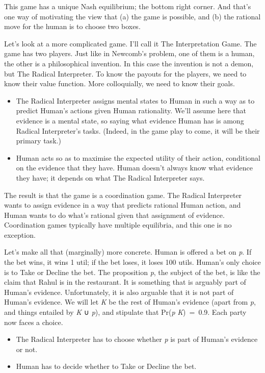 \documentclass[
  12pt,
  letterpaper,
]{scrbook}
\providecommand{\tightlist}{%
  \setlength{\itemsep}{0pt}\setlength{\parskip}{0pt}}\usepackage{longtable,booktabs,array}
\begin{document}
This game has a unique Nash equilibrium; the bottom right corner. And
that's one way of motivating the view that (a) the game is possible, and
(b) the rational move for the human is to choose two boxes.

Let's look at a more complicated game. I'll call it The Interpretation
Game. The game has two players. Just like in Newcomb's problem, one of
them is a human, the other is a philosophical invention. In this case
the invention is not a demon, but The Radical Interpreter. To know the
payouts for the players, we need to know their value function. More
colloquially, we need to know their goals.

\begin{itemize}
\tightlist
\item
  The Radical Interpreter assigns mental states to Human in such a way
  as to predict Human's actions given Human rationality. We'll assume
  here that evidence is a mental state, so saying what evidence Human
  has is among Radical Interpreter's tasks. (Indeed, in the game play to
  come, it will be their primary task.)
\item
  Human acts so as to maximise the expected utility of their action,
  conditional on the evidence that they have. Human doesn't always know
  what evidence they have; it depends on what The Radical Interpreter
  says.
\end{itemize}

The result is that the game is a coordination game. The Radical
Interpreter wants to assign evidence in a way that predicts rational
Human action, and Human wants to do what's rational given that
assignment of evidence. Coordination games typically have multiple
equilibria, and this one is no exception.

Let's make all that (marginally) more concrete. Human is offered a bet
on \emph{p}. If the bet wins, it wins 1 util; if the bet loses, it loses
100 utils. Human's only choice is to Take or Decline the bet. The
proposition \emph{p}, the subject of the bet, is like the claim that
Rahul is in the restaurant. It is something that is arguably part of
Human's evidence. Unfortunately, it is also arguable that it is not part
of Human's evidence. We will let \emph{K} be the rest of Human's
evidence (apart from \emph{p}, and things entailed by \emph{K} ∪
\emph{p}), and stipulate that Pr(\emph{p} \textbar{}\emph{K})~=~0.9.
Each party now faces a choice.

\begin{itemize}
\tightlist
\item
  The Radical Interpreter has to choose whether \emph{p} is part of
  Human's evidence or not.
\item
  Human has to decide whether to Take or Decline the bet.
\end{itemize}
\end{document}
